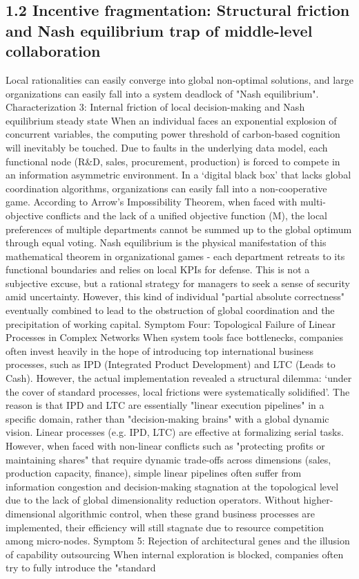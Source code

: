 \documentclass[11pt,a4paper]{article}
\begin{document}
\subsection*{1.2 Incentive fragmentation: Structural friction and Nash equilibrium trap of middle-level collaboration}


Local rationalities can easily converge into global non-optimal solutions, and large organizations can easily fall into a system deadlock of "Nash equilibrium". Characterization 3: Internal friction of local decision-making and Nash equilibrium steady state When an individual faces an exponential explosion of concurrent variables, the computing power threshold of carbon-based cognition will inevitably be touched. Due to faults in the underlying data model, each functional node (R\&D, sales, procurement, production) is forced to compete in an information asymmetric environment. In a ‘digital black box’ that lacks global coordination algorithms, organizations can easily fall into a non-cooperative game. According to Arrow's Impossibility Theorem, when faced with multi-objective conflicts and the lack of a unified objective function (M), the local preferences of multiple departments cannot be summed up to the global optimum through equal voting. Nash equilibrium is the physical manifestation of this mathematical theorem in organizational games - each department retreats to its functional boundaries and relies on local KPIs for defense. This is not a subjective excuse, but a rational strategy for managers to seek a sense of security amid uncertainty. However, this kind of individual "partial absolute correctness" eventually combined to lead to the obstruction of global coordination and the precipitation of working capital. Symptom Four: Topological Failure of Linear Processes in Complex Networks When system tools face bottlenecks, companies often invest heavily in the hope of introducing top international business processes, such as IPD (Integrated Product Development) and LTC (Leads to Cash). However, the actual implementation revealed a structural dilemma: ‘under the cover of standard processes, local frictions were systematically solidified’. The reason is that IPD and LTC are essentially "linear execution pipelines" in a specific domain, rather than "decision-making brains" with a global dynamic vision. Linear processes (e.g. IPD, LTC) are effective at formalizing serial tasks. However, when faced with non-linear conflicts such as "protecting profits or maintaining shares" that require dynamic trade-offs across dimensions (sales, production capacity, finance), simple linear pipelines often suffer from information congestion and decision-making stagnation at the topological level due to the lack of global dimensionality reduction operators. Without higher-dimensional algorithmic control, when these grand business processes are implemented, their efficiency will still stagnate due to resource competition among micro-nodes. Symptom 5: Rejection of architectural genes and the illusion of capability outsourcing When internal exploration is blocked, companies often try to fully introduce the "standard 
\end{document}
